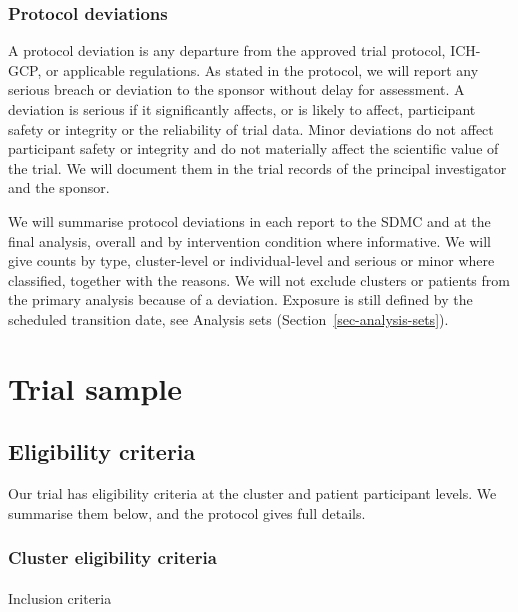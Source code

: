 \documentclass[
]{scrartcl}
\makeatletter
\let\oldparagraph\paragraph
\renewcommand{\paragraph}{
    \@ifstar
      \xxxParagraphStar
      \xxxParagraphNoStar
  }
\newcommand{\xxxParagraphStar}[1]{\oldparagraph*{#1}\mbox{}}
\newcommand{\xxxParagraphNoStar}[1]{\oldparagraph{#1}\mbox{}}
\makeatother
\begin{document}
\subsubsection{Protocol deviations}\label{sec-protocol-deviations}

A protocol deviation is any departure from the approved trial protocol,
ICH-GCP, or applicable regulations. As stated in the protocol, we will
report any serious breach or deviation to the sponsor without delay for
assessment. A deviation is serious if it significantly affects, or is
likely to affect, participant safety or integrity or the reliability of
trial data. Minor deviations do not affect participant safety or
integrity and do not materially affect the scientific value of the
trial. We will document them in the trial records of the principal
investigator and the sponsor.

We will summarise protocol deviations in each report to the SDMC and at
the final analysis, overall and by intervention condition where
informative. We will give counts by type, cluster-level or
individual-level and serious or minor where classified, together with
the reasons. We will not exclude clusters or patients from the primary
analysis because of a deviation. Exposure is still defined by the
scheduled transition date, see Analysis sets
(Section~\ref{sec-analysis-sets}).

\section{Trial sample}\label{sec-trial-sample}

\subsection{Eligibility criteria}\label{sec-eligibility-criteria}

Our trial has eligibility criteria at the cluster and patient
participant levels. We summarise them below, and the protocol gives full
details.

\subsubsection{Cluster eligibility
criteria}\label{sec-cluster-eligibility-criteria}

\paragraph{Inclusion criteria}\label{inclusion-criteria}
\end{document}
